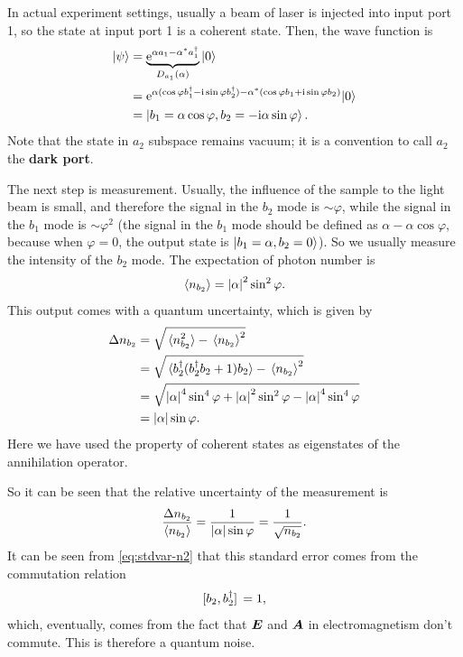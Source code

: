 \documentclass[hyperref, a4paper]{article}
\newcommand*{\ii}{\mathrm{i}}
\newcommand*{\ee}{\mathrm{e}}
\newcommand*{\concept}[1]{{\textbf{#1}}}
\begin{document}
In actual experiment settings,
usually a beam of laser is injected into input port 1,
so the state at input port 1 is a coherent state.
Then, the wave function is 
\begin{equation}
    \begin{aligned}
        \ket{\psi} &= \underbrace{\ee^{\alpha a_1 - \alpha^* a_1^\dagger}}_{D_{a_1}(\alpha)} \ket{0} \\
        &= \ee^{\alpha (\cos \varphi b_1^\dagger - \ii \sin \varphi b_2^\dagger) -\alpha^{*} (\cos \varphi b_1 + \ii \sin \varphi b_2)}|0\rangle \\
        &= \ket{b_1 = \alpha \cos \varphi, b_2 = - \ii \alpha \sin \varphi} .
    \end{aligned}
    \label{eq:out-state}
\end{equation}
Note that the state in $a_2$ subspace remains vacuum;
it is a convention to call $a_2$ the \concept{dark port}.

The next step is measurement.
Usually, the influence of the sample to the light beam is small,
and therefore the signal in the $b_2$ mode is $\sim \varphi$,
while the signal in the $b_1$ mode is $\sim \varphi^2$
(the signal in the $b_1$ mode should be defined as $\alpha - \alpha \cos \varphi$,
because when $\varphi = 0$, the output state is $\ket{b_1 = \alpha, b_2 = 0}$).
So we usually measure the intensity of the $b_2$ mode.
The expectation of photon number is 
\begin{equation}
    \expval{n_{b_2}} = \abs{\alpha}^2 \sin^2 \varphi.
\end{equation}
This output comes with a quantum uncertainty, which is given by 
\begin{equation}
    \begin{aligned}
        \Delta n_{b_2} &= \sqrt{ \expval*{n_{b_2}^2} - \expval*{n_{b_2}}^2 } \\
        &= \sqrt{ \expval*{ b_2^\dagger (b_2^\dagger b_2 + 1) b_2} - \expval*{n_{b_2}}^2 } \\
        &= \sqrt{ \abs{\alpha}^4 \sin^4 \varphi + \abs{\alpha}^2 \sin^2 \varphi - \abs{\alpha}^4 \sin^4 \varphi } \\
        &= \abs{\alpha} \sin \varphi.
    \end{aligned}
    \label{eq:stdvar-n2}
\end{equation}
Here we have used the property of coherent states as eigenstates of the annihilation operator.

So it can be seen that the relative uncertainty of the measurement is 
\begin{equation}
    \frac{\Delta n_{b_2}}{\expval{n_{b_2}}} = \frac{1}{\abs{\alpha} \sin \varphi} = \frac{1}{\sqrt{n_{b_2}}}.
    \label{eq:relvar-n2}
\end{equation}
It can be seen from \eqref{eq:stdvar-n2} that this standard error comes from the commutation relation 
\begin{equation}
    \comm*{b_2}{b_2^\dagger} = 1,
\end{equation}
which, eventually, comes from the fact that $\vb*{E}$ and $\vb*{A}$ in electromagnetism don't commute.
This is therefore a quantum noise.
\end{document}
